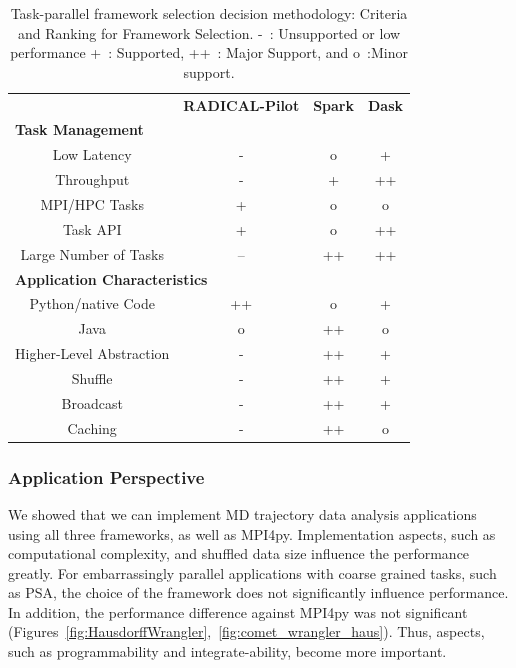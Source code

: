\begin{table}[t]
    \scriptsize
    \centering
    \begin{tabular}{@{}cccc@{}}
        \toprule
        &\textbf{RADICAL-Pilot}     &\textbf{Spark} &\textbf{Dask}\\
        \multicolumn{4}{l}{\textbf{Task Management}} \\
        \midrule
        Low Latency   &- &o &+\\
        Throughput    &- &+ &++\\
        MPI/HPC Tasks &+ &o &o\\
        Task API   &+ &o &++\\
        Large Number of Tasks   &-- &++ &++\\\hline
        \multicolumn{4}{l}{\textbf{Application Characteristics}}\\\midrule
        Python/native Code &++ &o &+\\
        Java               &o &++ &o\\
        Higher-Level Abstraction &- &++ &+\\
        Shuffle                  &- &++ &+\\
        Broadcast                &- &++ &+\\
        Caching                  &- &++ &o\\
        \bottomrule
    \end{tabular}
    \caption{Task-parallel framework selection decision methodology: Criteria and Ranking for Framework Selection. -~: Unsupported or low performance
        +~: Supported, ++~: Major Support, and o~:Minor support.\label{tab:framework}}
\end{table}

\subsubsection*{Application Perspective}
We showed that we can implement MD trajectory data analysis applications using all three frameworks, as well as MPI4py.
Implementation aspects, such as computational complexity, and shuffled data size influence the performance greatly.
For embarrassingly parallel applications with coarse grained tasks, such as PSA, the choice of the framework does not significantly influence performance.
In addition, the performance difference against MPI4py was not significant (Figures~\ref{fig:HausdorffWrangler},~\ref{fig:comet_wrangler_haus}).
Thus, aspects, such as programmability and integrate-ability, become more important.

